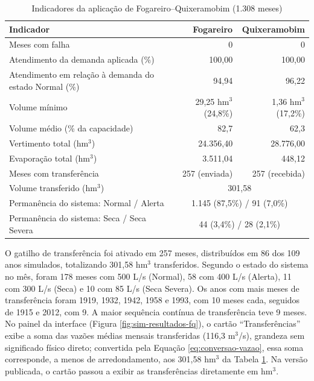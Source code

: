 \begin{table}[H]
    \captionsetup{width=15cm}
    \caption{Indicadores da aplicação de Fogareiro--Quixeramobim (1.308 meses)}
    \label{tab:fq-indicadores}
    \centering
    \footnotesize
    \begin{tabular}{lrr}
        \toprule
        Indicador & Fogareiro & Quixeramobim \\
        \midrule
        Meses com falha & 0 & 0 \\
        Atendimento da demanda aplicada (\%) & 100,00 & 100,00 \\
        Atendimento em relação à demanda do estado Normal (\%) & 94,94 & 96,22 \\
        Volume mínimo & 29,25 hm$^3$ (24,8\%) & 1,36 hm$^3$ (17,2\%) \\
        Volume médio (\% da capacidade) & 82,7 & 62,3 \\
        Vertimento total (hm$^3$) & 24.356,40 & 28.776,00 \\
        Evaporação total (hm$^3$) & 3.511,04 & 448,12 \\
        Meses com transferência & 257 (enviada) & 257 (recebida) \\
        Volume transferido (hm$^3$) & \multicolumn{2}{c}{301,58} \\
        \midrule
        Permanência do sistema: Normal / Alerta & \multicolumn{2}{c}{1.145 (87,5\%) / 91 (7,0\%)} \\
        Permanência do sistema: Seca / Seca Severa & \multicolumn{2}{c}{44 (3,4\%) / 28 (2,1\%)} \\
        \bottomrule
    \end{tabular}
\end{table}

O gatilho de transferência foi ativado em 257 meses, distribuídos em 86 dos 109 anos simulados, totalizando 301,58 hm$^3$ transferidos. Segundo o estado do sistema no mês, foram 178 meses com 500 L/s (Normal), 58 com 400 L/s (Alerta), 11 com 300 L/s (Seca) e 10 com 85 L/s (Seca Severa). Os anos com mais meses de transferência foram 1919, 1932, 1942, 1958 e 1993, com 10 meses cada, seguidos de 1915 e 2012, com 9. A maior sequência contínua de transferência teve 9 meses. No painel da interface (Figura \ref{fig:sim-resultados-fq}), o cartão ``Transferências'' exibe a soma das vazões médias mensais transferidas (116,3 m$^3$/s), grandeza sem significado físico direto; convertida pela Equação \ref{eq:conversao-vazao}, essa soma corresponde, a menos de arredondamento, aos 301,58 hm$^3$ da Tabela \ref{tab:fq-indicadores}. Na versão publicada, o cartão passou a exibir as transferências diretamente em hm$^3$.

